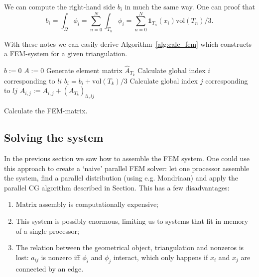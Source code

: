 \documentclass[11pt]{amsart}
\theoremstyle{definition}
\begin{document}
We can compute the right-hand side $b_i$ in much the same way. One can proof that
\[
  b_i = \int_\Omega \phi_i = \sum_{n=0}^N \int_{T_n} \phi_i
	= \sum_{n=0}^N \mathbf{1}_{T_n}(x_i)\text{vol}(T_n)/3.
\]

With these notes we can easily derive Algorithm~\ref{alg:calc_fem} which constructs a FEM-system for a given triangulation.

\begin{algorithm}[H]
	$b := 0$\;
	$A := 0$\;
	 {
		Generate element matrix $\hat A_{T_k}$\;
		 {
			Calculate global index $i$ corresponding to $li$\;
			 {
				$b_i = b_i + \text{vol}(T_k)/3$\;
				 {
					Calculate global index $j$ corresponding to $lj$\;
					 {
						$A_{i,j} := A_{i,j} + (A_{T_k})_{li,lj}$\;
					}
				}
			}
		}
	}
 \caption{Calculate the FEM-matrix.}
 \label{alg:calc_fem}
\end{algorithm}
\subsection{Solving the system}
In the previous section we saw how to assemble the FEM system. One could use this approach to create a `naive' parallel FEM solver: let one processor assemble the system, find a parallel distribution (using e.g. Mondriaan) and apply the parallel CG algorithm described in Section\cite{BLA}. This has a few disadvantages:
\begin{enumerate}
  \item Matrix assembly is computationally expensive;
  \item This system is possibly enormous, limiting us to systems that fit in memory of a single processor;
  \item The relation between the geometrical object, triangulation and nonzeros is lost: $a_{ij}$ is nonzero iff $\phi_i$ and $\phi_j$ interact, which only happens if $x_i$ and $x_j$ are connected by an edge.
\end{enumerate}
\end{document}
